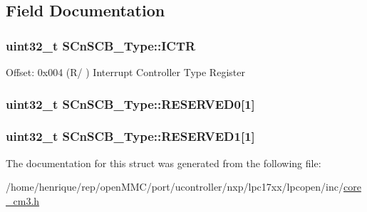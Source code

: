\subsection{Field Documentation}
\hypertarget{structSCnSCB__Type_ad99a25f5d4c163d9005ca607c24f6a98}{
\subsubsection[{I\-C\-T\-R}]{ uint32\-\_\-t S\-Cn\-S\-C\-B\-\_\-\-Type\-::\-I\-C\-T\-R}}\label{structSCnSCB__Type_ad99a25f5d4c163d9005ca607c24f6a98}
Offset\-: 0x004 (R/ ) Interrupt Controller Type Register \hypertarget{structSCnSCB__Type_afe1d5fd2966d5062716613b05c8d0ae1}{
\subsubsection[{R\-E\-S\-E\-R\-V\-E\-D0}]{\setlength{\rightskip}{0pt plus 5cm}uint32\-\_\-t S\-Cn\-S\-C\-B\-\_\-\-Type\-::\-R\-E\-S\-E\-R\-V\-E\-D0\mbox{[}1\mbox{]}}}\label{structSCnSCB__Type_afe1d5fd2966d5062716613b05c8d0ae1}
\hypertarget{structSCnSCB__Type_a7343aadfc9e7a15e58c26b67c5d576c1}{
\subsubsection[{R\-E\-S\-E\-R\-V\-E\-D1}]{\setlength{\rightskip}{0pt plus 5cm}uint32\-\_\-t S\-Cn\-S\-C\-B\-\_\-\-Type\-::\-R\-E\-S\-E\-R\-V\-E\-D1\mbox{[}1\mbox{]}}}\label{structSCnSCB__Type_a7343aadfc9e7a15e58c26b67c5d576c1}


The documentation for this struct was generated from the following file\-:\begin{DoxyCompactItemize}
\item 
/home/henrique/rep/open\-M\-M\-C/port/ucontroller/nxp/lpc17xx/lpcopen/inc/\hyperlink{core__cm3_8h}{core\-\_\-cm3.\-h}\end{DoxyCompactItemize}

